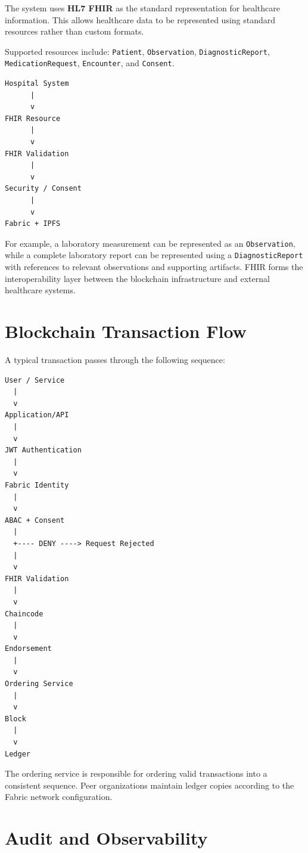 \documentclass[11pt,a4paper]{article}
\begin{document}
The system uses \textbf{HL7 FHIR} as the standard representation for healthcare information. This allows healthcare data to be represented using standard resources rather than custom formats.

Supported resources include: \texttt{Patient}, \texttt{Observation}, \texttt{DiagnosticReport}, \texttt{MedicationRequest}, \texttt{Encounter}, and \texttt{Consent}.

\begin{lstlisting}
Hospital System
      |
      v
FHIR Resource
      |
      v
FHIR Validation
      |
      v
Security / Consent
      |
      v
Fabric + IPFS
\end{lstlisting}

For example, a laboratory measurement can be represented as an \texttt{Observation}, while a complete laboratory report can be represented using a \texttt{DiagnosticReport} with references to relevant observations and supporting artifacts. FHIR forms the interoperability layer between the blockchain infrastructure and external healthcare systems.

\newpage
\section{Blockchain Transaction Flow}

A typical transaction passes through the following sequence:

\begin{lstlisting}
User / Service
  |
  v
Application/API
  |
  v
JWT Authentication
  |
  v
Fabric Identity
  |
  v
ABAC + Consent
  |
  +---- DENY ----> Request Rejected
  |
  v
FHIR Validation
  |
  v
Chaincode
  |
  v
Endorsement
  |
  v
Ordering Service
  |
  v
Block
  |
  v
Ledger
\end{lstlisting}

The ordering service is responsible for ordering valid transactions into a consistent sequence. Peer organizations maintain ledger copies according to the Fabric network configuration.

\newpage
\section{Audit and Observability}
\end{document}
